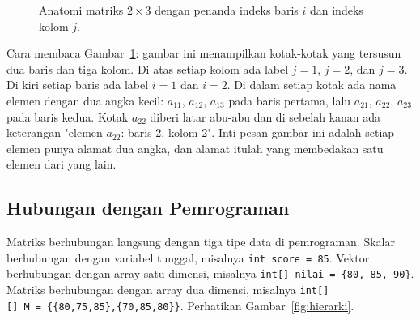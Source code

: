 \documentclass[11pt,a4paper]{article}
\begin{document}
\begin{figure}[H]
	\centering
	\caption{Anatomi matriks $2\times 3$ dengan penanda indeks baris $i$ dan indeks kolom $j$.}
	\label{fig:anatomi}
\end{figure}

Cara membaca Gambar~\ref{fig:anatomi}: gambar ini menampilkan kotak-kotak yang tersusun dua baris dan tiga kolom. Di atas setiap kolom ada label $j=1$, $j=2$, dan $j=3$. Di kiri setiap baris ada label $i=1$ dan $i=2$. Di dalam setiap kotak ada nama elemen dengan dua angka kecil: $a_{11}$, $a_{12}$, $a_{13}$ pada baris pertama, lalu $a_{21}$, $a_{22}$, $a_{23}$ pada baris kedua. Kotak $a_{22}$ diberi latar abu-abu dan di sebelah kanan ada keterangan "elemen $a_{22}$: baris 2, kolom 2". Inti pesan gambar ini adalah setiap elemen punya alamat dua angka, dan alamat itulah yang membedakan satu elemen dari yang lain.

\subsection{Hubungan dengan Pemrograman}

Matriks berhubungan langsung dengan tiga tipe data di pemrograman. Skalar berhubungan dengan variabel tunggal, misalnya \texttt{int~score~=~85}. Vektor berhubungan dengan array satu dimensi, misalnya \texttt{int[]~nilai~=~\{80,~85,~90\}}. Matriks berhubungan dengan array dua dimensi, misalnya \texttt{int[][]~M~=~\{\{80,75,85\},\{70,85,80\}\}}. Perhatikan Gambar~\ref{fig:hierarki}.
\end{document}
